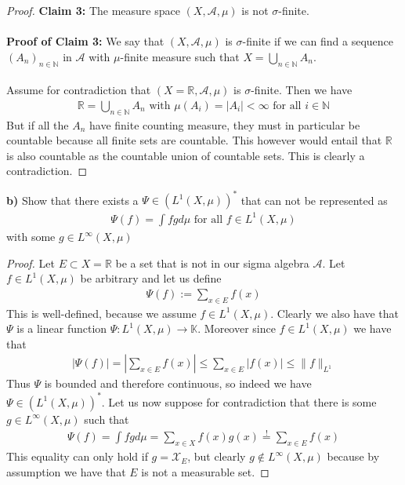 \documentclass[12pt,a4paper]{article}
\begin{document}
\begin{proof}
\textbf{Claim 3:} The measure space $(X, \mathcal{A}, \mu)$ is not $\sigma$-finite. 
\\\\
\textbf{Proof of Claim 3:} We say that $(X, \mathcal{A},  \mu)$ is $\sigma$-finite if we can find a sequence $(A_n)_{n \in \mathbb{N}}$ in $\mathcal{A}$ with $\mu$-finite measure such that $X= \bigcup_{n \in \mathbb{N}} A_n$. 
\\\\
Assume for contradiction that $( X= \mathbb{R}, \mathcal{A}, \mu)$ is $\sigma$-finite. Then we have
\begin{align*}
\mathbb{R}= \bigcup_{n \in \mathbb{N}} A_n \text{ with } \mu(A_i)= |A_i| < \infty \text{ for all } i \in \mathbb{N}
\end{align*}
But if all the $A_n$ have finite counting measure, they must in particular be countable because all finite sets are countable. This however would entail that $\mathbb{R}$ is also countable as the countable union of countable sets. This is clearly a contradiction. 
\end{proof}
\newpage
\noindent \textbf{b)} Show that there exists a $\Psi \in (L^1(X, \mu))^*$ that can not be represented as \begin{align*}
\Psi(f) = \int fg d \mu \text{ for all } f \in L^1(X, \mu)
\end{align*}
with some $g \in L^\infty (X, \mu) $ 
\begin{proof}
Let $E \subset X= \mathbb{R}$ be a set that is not in our sigma algebra $\mathcal{A}$. Let $f \in L^1( X, \mu)$ be arbitrary and let us define
\begin{align*}
\Psi(f):= \sum_{x \in E} f(x) 
\end{align*}
This is well-defined, because we assume $f \in L^1(X, \mu)$. Clearly we also have that $\Psi$ is a linear function $\Psi: L^1(X, \mu) \to \mathbb{K}$. Moreover since $f \in L^1(X, \mu)$ we have that
\begin{align*}
|\Psi(f)| = \left | \sum_{x \in E} f(x) \right| \leq \sum_{x \in E} |f(x)|  \leq \|f\|_{L^1}
\end{align*}
Thus $\Psi$ is bounded and therefore continuous, so indeed we have $\Psi \in (L^1(X, \mu))^*$. Let us now suppose for contradiction that there is some $g \in L^\infty (X, \mu)$ such that \begin{align*}
\Psi(f) = \int fg d \mu = \sum_{x \in X} f(x)g(x) \overset{!}= \sum_{x \in E} f(x)
\end{align*}
This equality can only hold if $g= \mathcal{X}_E$, but clearly $g \notin L^\infty(X, \mu)$ because by assumption we have that $E$ is not a measurable set. 
\end{proof}
\newpage
\end{document}
